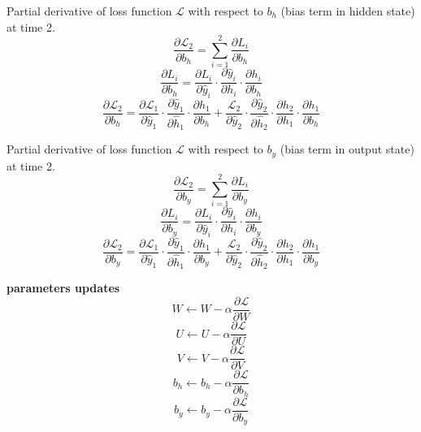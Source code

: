 \documentclass[12pt,a4paper]{article}
\begin{document}
Partial derivative of loss function $\mathcal{L}$ with respect to $b_h$ (bias term in hidden state) at time 2.\\
\begin{equation}
    \dfrac{\partial\mathcal{L}_2}{\partial{b_h}} = \sum_{i=1}^{2}\dfrac{\partial L_i}{\partial b_h}
\end{equation}
\begin{equation}
    \dfrac{\partial L_i}{\partial b_h} = \dfrac{\partial L_i}{\partial \hat{y}_i} \cdot \dfrac{\partial \hat{y}_i}{\partial h_i} \cdot \dfrac{\partial h_i}{\partial b_h}
\end{equation}
\begin{equation}
    \dfrac{\partial\mathcal{L}_2}{\partial b_h} = \dfrac{\partial\mathcal{L}_1}{\partial\hat{y}_1}\cdot\dfrac{\partial\hat{y}_1}{\partial\hat{h}_1}\cdot\dfrac{\partial h_1}{\partial b_h}+\dfrac{\mathcal{L}_2}{\partial\hat{y}_2}\cdot\dfrac{\partial\hat{y}_2}{\partial\hat{h}_2}\cdot\dfrac{\partial h_2}{\partial h_1}\cdot\dfrac{\partial h_1}{\partial b_h}
\end{equation}

Partial derivative of loss function $\mathcal{L}$ with respect to $b_y$ (bias term in output state) at time 2.
\begin{equation}
    \dfrac{\partial\mathcal{L}_2}{\partial{b_y}} = \sum_{i=1}^{2}\dfrac{\partial L_i}{\partial b_y}
\end{equation}
\begin{equation}
    \dfrac{\partial L_i}{\partial b_y} = \dfrac{\partial L_i}{\partial \hat{y}_i} \cdot \dfrac{\partial \hat{y}_i}{\partial h_i} \cdot \dfrac{\partial h_i}{\partial b_y}
\end{equation}
\begin{equation}
    \dfrac{\partial\mathcal{L}_2}{\partial b_y} = \dfrac{\partial\mathcal{L}_1}{\partial\hat{y}_1}\cdot\dfrac{\partial\hat{y}_1}{\partial\hat{h}_1}\cdot\dfrac{\partial h_1}{\partial b_y}+\dfrac{\mathcal{L}_2}{\partial\hat{y}_2}\cdot\dfrac{\partial\hat{y}_2}{\partial\hat{h}_2}\cdot\dfrac{\partial h_2}{\partial h_1}\cdot\dfrac{\partial h_1}{\partial b_y}
\end{equation}

\textbf{parameters updates}
\begin{equation}
    W \leftarrow W - \alpha\dfrac{\partial\mathcal{L}}{\partial W}
\end{equation}
\begin{equation}
    U \leftarrow U - \alpha\dfrac{\partial\mathcal{L}}{\partial U}
\end{equation}
\begin{equation}
    V \leftarrow V - \alpha\dfrac{\partial\mathcal{L}}{\partial V}
\end{equation}
\begin{equation}
    b_h \leftarrow b_h - \alpha\dfrac{\partial\mathcal{L}}{\partial b_h}
\end{equation}
\begin{equation}
    b_y \leftarrow b_y - \alpha\dfrac{\partial\mathcal{L}}{\partial b_y}
\end{equation}
\end{document}
